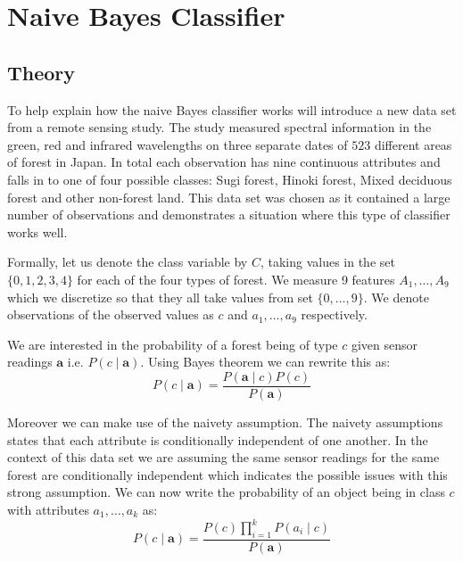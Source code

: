\chapter{Naive Bayes Classifier}

\section{Theory}

To help explain how the naive Bayes classifier works will introduce a new data set from a remote sensing study.
The study measured spectral information in the green, red and infrared wavelengths on three separate dates of $523$ different areas of forest in Japan.
In total each observation has nine continuous attributes and falls in to one of four possible classes: Sugi forest, Hinoki forest, Mixed deciduous forest and other non-forest land.
This data set was chosen as it contained a large number of observations and demonstrates a situation where this type of classifier works well.

Formally, let us denote the class variable by $C$, taking values in the set $\{0,1,2,3,4\}$ for each of the four types of forest.
We measure 9 features $A_1,\dots,A_9$ which we discretize so that they all take values from set $\{0,\dots,9\}$.
We denote observations of the observed values as $c$ and $a_1,\dots,a_9$ respectively.

We are interested in the probability of a forest being of type $c$ given sensor readings $\mathbf{a}$ i.e. $P(c \mid \mathbf{a})$.
Using Bayes theorem we can rewrite this as:
\begin{equation} \label{bayes}
	P(c \mid \mathbf{a}) = \frac{P(\mathbf{a} \mid c)P(c)}{P(\mathbf{a})}
\end{equation}

Moreover we can make use of the naivety assumption.
The naivety assumptions states that each attribute is conditionally independent of one another.
In the context of this data set we are assuming the same sensor readings for the same forest are conditionally independent which indicates the possible issues with this strong assumption.
We can now write the probability of an object being in class $c$ with attributes $a_1,\dots,a_k$ as:
\begin{equation} \label{naivety}
	P(c \mid \mathbf{a}) = \frac{P(c)\prod_{i=1}^{k}P(a_i \mid c)}{P(\mathbf{a})}
\end{equation}

